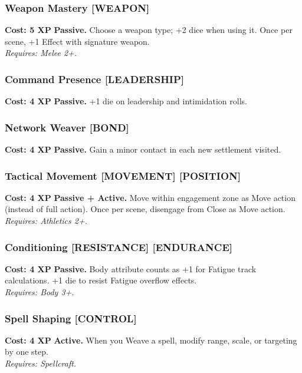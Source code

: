 \subsubsection*{Weapon Mastery \textnormal{[WEAPON]}}
\label{talent:weapon-mastery}
\textbf{Cost: 5 XP} \textbf{Passive.} Choose a weapon type; +2 dice when using it. Once per scene, +1 Effect with signature weapon. \\
\textit{Requires: Melee 2+.}

\subsubsection*{Command Presence \textnormal{[LEADERSHIP]}}
\label{talent:command-presence}
\textbf{Cost: 4 XP} \textbf{Passive.} +1 die on leadership and intimidation rolls.

\subsubsection*{Network Weaver \textnormal{[BOND]}}
\label{talent:network-weaver}
\textbf{Cost: 4 XP} \textbf{Passive.} Gain a minor contact in each new settlement visited.

\subsubsection*{Tactical Movement \textnormal{[MOVEMENT] [POSITION]}}
\label{talent:tactical-movement}
\textbf{Cost: 4 XP} \textbf{Passive + Active.} Move within engagement zone as Move action (instead of full action). Once per scene, disengage from Close as Move action. \\
\textit{Requires: Athletics 2+.}

\subsubsection*{Conditioning \textnormal{[RESISTANCE] [ENDURANCE]}}
\label{talent:conditioning}
\textbf{Cost: 4 XP} \textbf{Passive.} Body attribute counts as +1 for Fatigue track calculations. +1 die to resist Fatigue overflow effects. \\
\textit{Requires: Body 3+.}

\subsubsection*{Spell Shaping \textnormal{[CONTROL]}}
\label{talent:spell-shaping}
\textbf{Cost: 4 XP} \textbf{Active.} When you Weave a spell, modify range, scale, or targeting by one step. \\
\textit{Requires: Spellcraft.}

